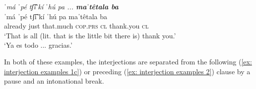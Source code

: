     \label{ex: interjection examples 1a}
        \label{ex: interjection examples 1b}
            \label{ex: interjection examples 1c}
    \z
\z

\ea\label{ex: interjection examples 2}

    \textit{ˈmá ˈpé tʃ͡iˈkí ˈhú pa ... \textbf{maˈtêtala ba}}\\
    \gll    ˈmá ˈpé tʃ͡iˈkí ˈhú pa maˈtêtala ba\\
            already just that.much \textsc{cop.prs} \textsc{cl} thank.you \textsc{cl}\\
    \glt    `That is all (lit. that is the little bit there is) thank you.'\\
    \glt    `Ya es todo ... gracias.'  \\

\z

In both of these examples, the interjections are separated from the following (\ref{ex: interjection examples 1c}) or preceding (\ref{ex: interjection examples 2}) clause by a pause and an intonational break.

